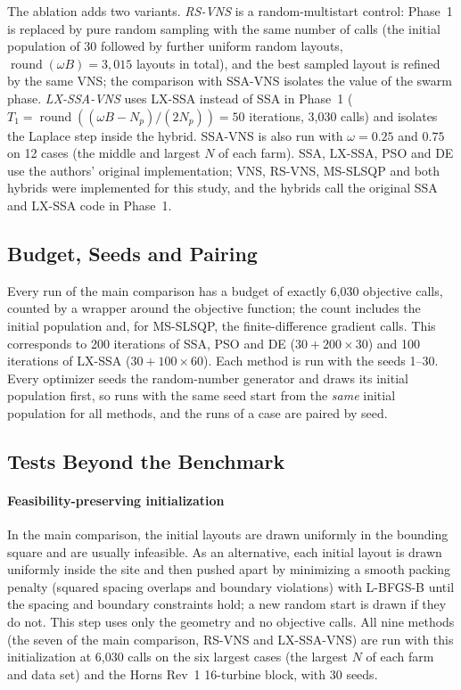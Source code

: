 \documentclass[journal,twoside]{IEEEtran}
\begin{document}
The ablation adds two variants. \emph{RS-VNS} is a random-multistart control: Phase~1 is replaced by pure random sampling with the same number of calls (the initial population of 30 followed by further uniform random layouts, $\operatorname{round}(\omega B)=3{,}015$ layouts in total), and the best sampled layout is refined by the same VNS; the comparison with SSA-VNS isolates the value of the swarm phase. \emph{LX-SSA-VNS} uses LX-SSA instead of SSA in Phase~1 ($T_1=\operatorname{round}((\omega B-N_p)/(2N_p))=50$ iterations, 3,030 calls) and isolates the Laplace step inside the hybrid. SSA-VNS is also run with $\omega=0.25$ and $0.75$ on 12 cases (the middle and largest $N$ of each farm). SSA, LX-SSA, PSO and DE use the authors' original implementation; VNS, RS-VNS, MS-SLSQP and both hybrids were implemented for this study, and the hybrids call the original SSA and LX-SSA code in Phase~1.

\subsection{Budget, Seeds and Pairing}
Every run of the main comparison has a budget of exactly 6,030 objective calls, counted by a wrapper around the objective function; the count includes the initial population and, for MS-SLSQP, the finite-difference gradient calls. This corresponds to 200 iterations of SSA, PSO and DE ($30+200\times30$) and 100 iterations of LX-SSA ($30+100\times60$). Each method is run with the seeds 1--30. Every optimizer seeds the random-number generator and draws its initial population first, so runs with the same seed start from the \emph{same} initial population for all methods, and the runs of a case are paired by seed.

\subsection{Tests Beyond the Benchmark}
\label{sec:setup-beyond}
\paragraph*{Feasibility-preserving initialization} In the main comparison, the initial layouts are drawn uniformly in the bounding square and are usually infeasible. As an alternative, each initial layout is drawn uniformly inside the site and then pushed apart by minimizing a smooth packing penalty (squared spacing overlaps and boundary violations) with L-BFGS-B until the spacing and boundary constraints hold; a new random start is drawn if they do not. This step uses only the geometry and no objective calls. All nine methods (the seven of the main comparison, RS-VNS and LX-SSA-VNS) are run with this initialization at 6,030 calls on the six largest cases (the largest $N$ of each farm and data set) and the Horns Rev~1 16-turbine block, with 30 seeds.
\end{document}

